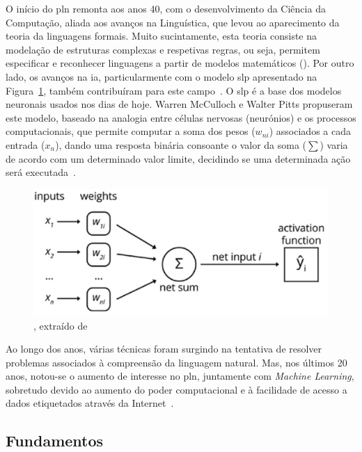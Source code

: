 O início do \gls{pln} remonta aos anos 40, com o desenvolvimento da Ciência da Computação, aliada aos avanços na Linguística, que levou ao aparecimento da teoria da linguagens formais. Muito sucintamente, esta teoria consiste na modelação de estruturas complexas e respetivas regras, ou seja, permitem especificar e reconhecer linguagens a partir de modelos matemáticos (). Por outro lado, os avanços na \gls{ia}, particularmente com o modelo \gls{slp} apresentado na Figura~\ref{fig:slp}, também contribuíram para este campo~\parencite{applied_natural_language_processing_with_python}. O \gls{slp} é a base dos modelos neuronais usados nos dias de hoje. Warren McCulloch e Walter Pitts propuseram este modelo, baseado na analogia entre células nervosas (neurónios) e os processos computacionais, que permite computar a soma dos pesos ($w_{ni}$) associados a cada entrada ($x_{n}$), dando uma resposta binária consoante o valor da soma ($\sum$) varia de acordo com um determinado valor limite, decidindo se uma determinada ação será executada~\parencite{introduction_theory_neural_computation}.

\begin{figure}[!t]
    \centering
    \includegraphics[width=.8\textwidth]{ch03/assets/slp_model.jpg}
    \caption{, extraído de~\textcite{applied_natural_language_processing_with_python}}
    \label{fig:slp}
\end{figure}

Ao longo dos anos, várias técnicas foram surgindo na tentativa de resolver problemas associados à compreensão da linguagem natural. Mas, nos últimos 20 anos, notou-se o aumento de interesse no \gls{pln}, juntamente com \textit{Machine Learning}, sobretudo devido ao aumento do poder computacional e à facilidade de acesso a dados etiquetados através da Internet~\parencite{applied_natural_language_processing_with_python}.

\subsection{Fundamentos}

